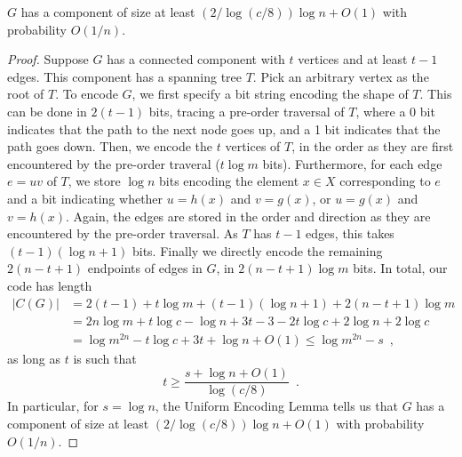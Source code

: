 \documentclass[format=acmsmall, review=false, screen=true]{acmart}
\begin{document}
\begin{lem}
  $G$ has a component of size at least $(2/\log(c/8))\log n + O(1)$
  with probability $O(1/n)$.
\end{lem}
\begin{proof}
  Suppose $G$ has a connected component with $t$ vertices and at least
  $t-1$ edges. This component has a spanning tree $T$. Pick an
  arbitrary vertex as the root of $T$. To encode $G$, we first specify
  a bit string encoding the shape of $T$.
  This can be done in $2(t - 1)$ bits, tracing a pre-order traversal of $T$, 
  where a 0 bit indicates that the path to the next node goes up, and a 1 bit indicates
  that the path goes down.
  Then, we encode the $t$ vertices of $T$, in the order as they are first encountered by
  the pre-order traveral ($t \log m$ bits). Furthermore, 
  for each edge $e = uv$ of $T$, 
  we store $\log n$ bits encoding the element $x \in X$ 
  corresponding to $e$ and a bit
  indicating whether $u = h(x)$ and $v = g(x)$, or $u
  = g(x)$ and $v = h(x)$. Again, the edges are stored
  in the order and direction as they are encountered by the 
  pre-order traversal. As $T$ has $t-1$ edges, 
  this takes $(t-1)(\log n + 1)$ bits.
  Finally we directly encode the remaining $2(n - t + 1)$ endpoints of edges in $G$,
  in $2(n-t+1)\log m$ bits.
 In total, our code has length
  \begin{align*}
    |C(G)| &= 2(t - 1) + t \log m + (t - 1) (\log n + 1) + 2 (n - t + 1) \log m \\
           &= 2n\log m + t \log c - \log n + 3t - 3 - 2t \log c + 2\log n + 2 \log c \tag{since $m = cn$}\\
           &= \log m^{2n} - t \log c + 3t + \log n + O(1) 
           \le \log m^{2n} - s \enspace ,
  \end{align*}
  as long as $t$ is such that
  \[
    t \geq \frac{s + \log n + O(1)}{\log (c/8)} \enspace .
  \]
  In particular, for $s = \log n$, the Uniform
  Encoding Lemma tells us that $G$ has a component of size at least
  $(2/\log (c/8))\log n + O(1)$ with probability $O(1/n)$.
\end{proof}
\end{document}
